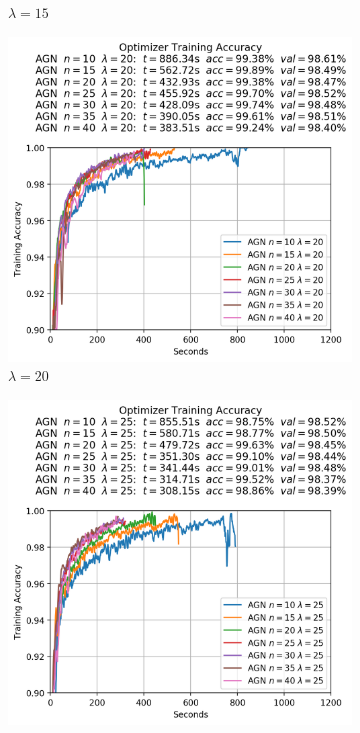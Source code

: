 \begin{figure}
\begin{subfigure}{.3\textwidth}
    \caption{$\lambda = 15$}
  \end{subfigure}
  \begin{subfigure}{.3\textwidth}
    \centering
    \includegraphics[width=\linewidth]{resources/images/agn_experiments_lambda_20}
    \caption{$\lambda = 20$}
  \end{subfigure}
  \begin{subfigure}{.3\textwidth}
    \centering
    \includegraphics[width=\linewidth]{resources/images/agn_experiments_lambda_25}

\end{subfigure}
\end{figure}

